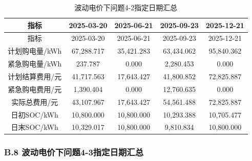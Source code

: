 \documentclass[zihao=-4,a4paper,UTF8,fontset=none]{ctexart}
\begin{document}
\begin{longtable}[]{@{}ccccc@{}}
\caption{波动电价下问题4-2指定日期汇总}\label{tab:appendix-B-7}\tabularnewline
\toprule\noalign{}
指标 & 2025-03-20 & 2025-06-21 & 2025-09-23 & 2025-12-21 \\
\midrule\noalign{}
\endfirsthead
\toprule\noalign{}
指标 & 2025-03-20 & 2025-06-21 & 2025-09-23 & 2025-12-21 \\
\midrule\noalign{}
\endhead
\bottomrule\noalign{}
\endlastfoot
计划购电量/kWh & 67,288.717 & 35,421.283 & 63,434.062 & 95,840.362 \\
紧急购电量/kWh & 237.787 & 0.000 & 2,280.453 & 0.000 \\
计划结算费用/元 & 41,717.563 & 17,643.427 & 41,800.852 & 72,825.887 \\
紧急购电费用/元 & 1,390.404 & 0.000 & 12,760.635 & 0.000 \\
实际总费用/元 & 43,107.967 & 17,643.427 & 54,561.488 & 72,825.887 \\
日初SOC/kWh & 10,800.000 & 10,800.000 & 10,293.388 & 10,705.477 \\
日末SOC/kWh & 10,329.017 & 10,800.000 & 9,810.834 & 10,800.000 \\
\end{longtable}

\endgroup

\clearpage\subsubsection*{B.8 波动电价下问题4-3指定日期汇总}

\begingroup\renewcommand{\tablename}{附表}\renewcommand{\thetable}{B-8}
\end{document}

